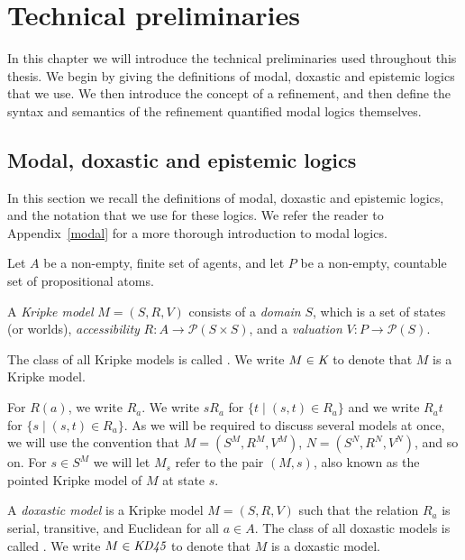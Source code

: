 \chapter{Technical preliminaries}\label{semantics}

In this chapter we will introduce the technical preliminaries used throughout
this thesis. We begin by giving the definitions of modal, doxastic and epistemic
logics that we use. We then introduce the concept of a refinement, and then
define the syntax and semantics of the refinement quantified modal logics
themselves.

\section{Modal, doxastic and epistemic logics}

In this section we recall the definitions of modal, doxastic and epistemic
logics, and the notation that we use for these logics. We refer the reader to
Appendix~\ref{modal} for a more thorough introduction to modal logics.

Let $A$ be a non-empty, finite set of agents, and let $P$ be a non-empty,
countable set of propositional atoms.

\begin{definition}
A \textit{Kripke model} $M = (S, R, V)$ consists of a \textit{domain} $S$, which
is a set of states (or worlds), \textit{accessibility} $R : A \to \mathcal{P}(S
\times S)$, and a \textit{valuation} $V : P \to \mathcal{P}(S)$. 

The class of all Kripke models is called \classK{}. We write $M \in \textit{K}{}$
to denote that $M$ is a Kripke model.
\end{definition}

For $R(a)$, we write $R_a$. We write $sR_a$ for $\{t \mid (s, t) \in R_a\}$ and
we write $R_at$ for $\{s \mid (s, t) \in R_a\}$. As we will be required to
discuss several models at once, we will use the convention that $M = (S^M, R^M,
V^M)$, $N = (S^N, R^N, V^N)$, and so on. For $s \in S^M$ we will let $M_s$ refer
to the pair $(M, s)$, also known as the pointed Kripke model of $M$ at state
$s$.

\begin{definition}
A \textit{doxastic model} is a Kripke model $M = (S, R, V)$ such that the
relation $R_a$ is serial, transitive, and Euclidean for all $a \in A$. The class
of all doxastic models is called \classKD{}. We write $M \in \textit{KD45}{}$ to
denote that $M$ is a doxastic model.
\end{definition}

